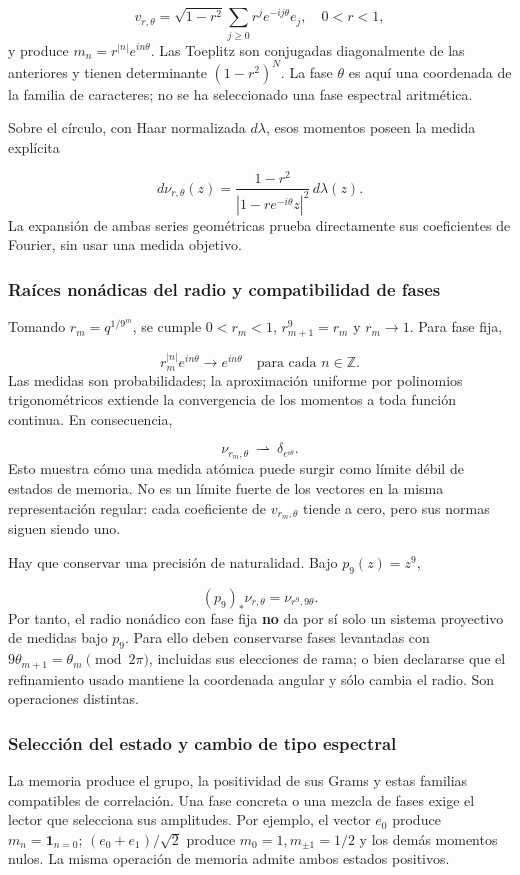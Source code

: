 \[
v_{r,\theta}=\sqrt{1-r^2}\sum_{j\ge0}r^j e^{-ij\theta}e_j,
\quad 0<r<1,
\]
y produce \(m_n=r^{|n|}e^{in\theta}\). Las Toeplitz son conjugadas diagonalmente de las anteriores y tienen determinante \((1-r^2)^N\). La fase \(\theta\) es aquí una coordenada de la familia de caracteres; no se ha seleccionado una fase espectral aritmética.

Sobre el círculo, con Haar normalizada \(d\lambda\), esos momentos poseen la medida explícita

\[
d\nu_{r,\theta}(z)
=\frac{1-r^2}{|1-r e^{-i\theta}z|^2}\,d\lambda(z).
\]
La expansión de ambas series geométricas prueba directamente sus coeficientes de Fourier, sin usar una medida objetivo.


\subsubsection{Raíces nonádicas del radio y compatibilidad de fases}
\label{tm-add-m3-1}
Tomando \(r_m=q^{1/9^m}\), se cumple \(0<r_m<1\), \(r_{m+1}^{9}=r_m\) y \(r_m\to1\). Para fase fija,

\[
r_m^{|n|}e^{in\theta}\longrightarrow e^{in\theta}
\quad\text{para cada }n\in\mathbb Z.
\]
Las medidas son probabilidades; la aproximación uniforme por polinomios trigonométricos extiende la convergencia de los momentos a toda función continua. En consecuencia,

\[
\nu_{r_m,\theta}\ \rightharpoonup\ \delta_{e^{i\theta}}.
\]
Esto muestra cómo una medida atómica puede surgir como límite débil de estados de memoria. No es un límite fuerte de los vectores en la misma representación regular: cada coeficiente de \(v_{r_m,\theta}\) tiende a cero, pero sus normas siguen siendo uno.

Hay que conservar una precisión de naturalidad. Bajo \(p_9(z)=z^9\),

\[
(p_9)_*\nu_{r,\theta}=\nu_{r^9,9\theta}.
\]
Por tanto, el radio nonádico con fase fija \textbf{no} da por sí solo un sistema proyectivo de medidas bajo \(p_9\). Para ello deben conservarse fases levantadas con \(9\theta_{m+1}=\theta_m\pmod{2\pi}\), incluidas sus elecciones de rama; o bien declararse que el refinamiento usado mantiene la coordenada angular y sólo cambia el radio. Son operaciones distintas.


\subsubsection{Selección del estado y cambio de tipo espectral}
\label{tm-add-m3-2}
La memoria produce el grupo, la positividad de sus Grams y estas familias compatibles de correlación. Una fase concreta o una mezcla de fases exige el lector que selecciona sus amplitudes. Por ejemplo, el vector \(e_0\) produce \(m_n=\mathbf1_{n=0}\); \((e_0+e_1)/\sqrt2\) produce \(m_0=1,m_{\pm1}=1/2\) y los demás momentos nulos. La misma operación de memoria admite ambos estados positivos.

